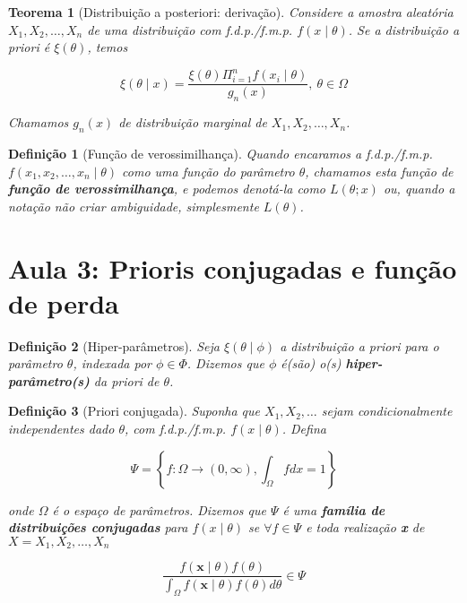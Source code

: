 \documentclass{article}
\newtheorem{theorem}{Teorema}
\newtheorem{definition}{Definição}
\begin{document}
\begin{theorem}[Distribuição a posteriori: derivação]
Considere a amostra aleatória $X_1, X_2, \ldots, X_n$ de uma distribuição com f.d.p./f.m.p. $f(x \mid \theta)$. Se a distribuição a priori é $\xi(\theta)$, temos

\begin{equation}
\xi(\theta \mid x) = \frac{\xi(\theta) \Pi_{i = 1}^{n} f(x_i \mid \theta)}{g_n(x)}, \ \theta \in \Omega
\end{equation}

Chamamos $g_n(x)$ de distribuição marginal de $X_1, X_2, \ldots, X_n$.
\end{theorem}

\begin{definition}[Função de verossimilhança]
Quando encaramos a f.d.p./f.m.p. $f(x_1, x_2, \ldots, x_n \mid \theta)$ como uma função do parâmetro $\theta$, chamamos esta função de \textbf{função de verossimilhança}, e podemos denotá-la como $L(\theta; x)$ ou, quando a notação não criar ambiguidade, simplesmente $L(\theta)$.
\end{definition}

\section*{Aula 3: Prioris conjugadas e função de perda}
\label{s3}
\begin{definition}[Hiper-parâmetros]
Seja $\xi(\theta \mid \phi)$ a distribuição a priori para o parâmetro $\theta$, indexada por $\phi \in \Phi$. Dizemos que $\phi$ é(são) o(s) \textbf{hiper-parâmetro(s)} da priori de $\theta$.
\end{definition}

\begin{definition}[Priori conjugada]
Suponha que $X_1, X_2, \ldots$ sejam condicionalmente independentes dado $\theta$, com f.d.p./f.m.p. $f(x\mid\theta)$. Defina

\begin{equation}
\Psi = \left \{ f: \Omega \rightarrow (0, \infty), \int_\Omega f dx = 1 \right \}
\end{equation}

onde $\Omega$ é o espaço de parâmetros. Dizemos que $\Psi$ é uma \textbf{família de distribuições conjugadas} para $f(x \mid \theta)$ se $\forall f \in \Psi$ e toda realização \textbf{x} de $X = X_1, X_2, \ldots, X_n$

\begin{equation}
\frac{f(\textbf{x} \mid \theta) f(\theta)}{\int_\Omega f(\textbf{x} \mid \theta)f(\theta) d \theta} \in \Psi
\end{equation}
\end{definition}
\end{document}
